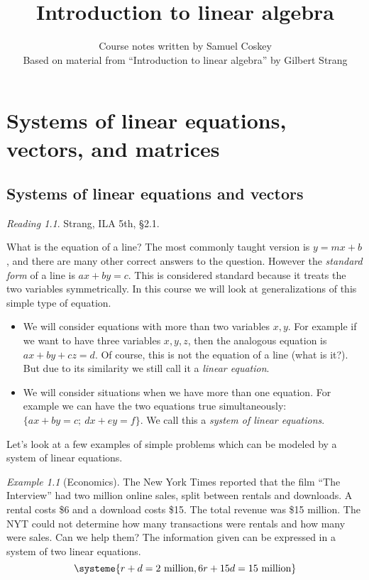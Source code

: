 \documentclass[11pt,oneside]{amsbook}
\title{Introduction to linear algebra}
\author{Course notes written by Samuel Coskey\\Based on material from ``Introduction to linear algebra'' by Gilbert Strang}
\theoremstyle{definition}
\theoremstyle{plain}
\theoremstyle{definition}
\theoremstyle{remark}
\newtheorem{example}[theorem]{Example}
\newtheorem*{reading}{Reading}
\numberwithin{equation}{section}
\numberwithin{figure}{section}
\begin{document}
\maketitle

\tableofcontents

\chapter{Systems of linear equations, vectors, and matrices}

\section{Systems of linear equations and vectors}

\begin{reading}
  Strang, ILA 5th, \S 2.1.
\end{reading}

What is the equation of a line? The most commonly taught version is $y=mx+b$, and there are many other correct answers to the question. However the \emph{standard form} of a line is $ax+by=c$. This is considered standard because it treats the two variables symmetrically. In this course we will look at generalizations of this simple type of equation.

\begin{itemize}
  \item We will consider equations with more than two variables $x,y$. For example if we want to have three variables $x,y,z$, then the analogous equation is $ax+by+cz=d$. Of course, this is not the equation of a line (what is it?). But due to its similarity we still call it a \emph{linear equation}.
  \item We will consider situations when we have more than one equation. For example we can have the two equations true simultaneously: $\{ax+by=c;\ dx+ey=f\}$. We call this a \emph{system of linear equations}.
\end{itemize}

Let's look at a few examples of simple problems which can be modeled by a system of linear equations.

\begin{example}[Economics]
  The New York Times reported that the film ``The Interview'' had two million online sales, split between rentals and downloads. A rental costs \$6 and a download costs \$15. The total revenue was \$15 million. The NYT could not determine how many transactions were rentals and how many were sales. Can we help them? The information given can be expressed in a system of two linear equations.
  \[\systeme{r+d=2\text{ million},6r+15d=15\text{ million}}
  \]
\end{example}
\end{document}

